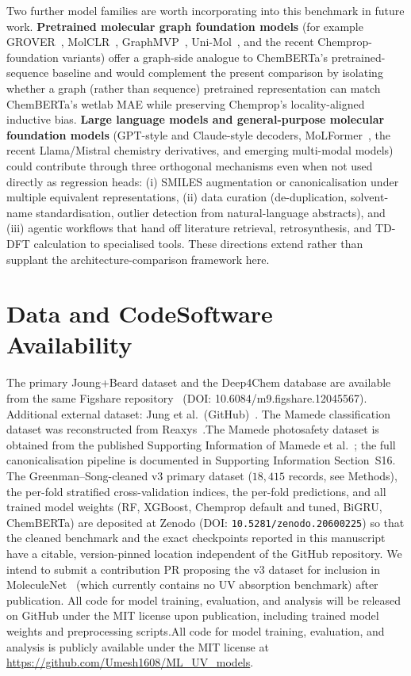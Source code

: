 \documentclass[journal=jcisd8,manuscript=article]{achemso}
\newcommand{\added}[1]{{\color{addedblue}#1}}
\newcommand{\removed}[1]{{\color{removedred}#1}}
\begin{document}
\added{Two further model families are worth incorporating into this benchmark in future work. \textbf{Pretrained molecular graph foundation models} (for example GROVER~\cite{rong2020grover}, MolCLR~\cite{wang2022molecular}, GraphMVP~\cite{liu2021pretraining}, Uni-Mol~\cite{zhou2023unimol}, and the recent Chemprop-foundation variants) offer a graph-side analogue to ChemBERTa's pretrained-sequence baseline and would complement the present comparison by isolating whether a graph (rather than sequence) pretrained representation can match ChemBERTa's wetlab MAE while preserving Chemprop's locality-aligned inductive bias. \textbf{Large language models and general-purpose molecular foundation models} (GPT-style and Claude-style decoders, MoLFormer~\cite{ross2022molformer}, the recent Llama/Mistral chemistry derivatives, and emerging multi-modal models) could contribute through three orthogonal mechanisms even when not used directly as regression heads: (i) SMILES augmentation or canonicalisation under multiple equivalent representations, (ii) data curation (de-duplication, solvent-name standardisation, outlier detection from natural-language abstracts), and (iii) agentic workflows that hand off literature retrieval, retrosynthesis, and TD-DFT calculation to specialised tools. These directions extend rather than supplant the architecture-comparison framework here.}


\section*{Data and \removed{Code}\added{Software} Availability}
The primary Joung+Beard dataset and the Deep4Chem database are available from the same Figshare repository~\cite{joung2020experimental, beard2019comparative} (DOI: 10.6084/m9.figshare.12045567).
Additional external dataset: Jung et al.\ (GitHub)~\cite{jung2024machine}.
\removed{The Mamede classification dataset was reconstructed from Reaxys~\cite{mamede2021machine}.}\added{The Mamede photosafety dataset is obtained from the published Supporting Information of Mamede et al.~\cite{mamede2021machine}; the full canonicalisation pipeline is documented in Supporting Information Section~S16.}
\added{The Greenman--Song-cleaned v3 primary dataset ($18{,}415$ records, see Methods), the per-fold stratified cross-validation indices, the per-fold predictions, and all trained model weights (RF, XGBoost, Chemprop default and tuned, BiGRU, ChemBERTa) are deposited at Zenodo (DOI: \texttt{10.5281/zenodo.20600225}) so that the cleaned benchmark and the exact checkpoints reported in this manuscript have a citable, version-pinned location independent of the GitHub repository. We intend to submit a contribution PR proposing the v3 dataset for inclusion in MoleculeNet~\cite{wuMoleculeNet2018} (which currently contains no UV absorption benchmark) after publication.}
\removed{All code for model training, evaluation, and analysis will be released on GitHub under the MIT license upon publication, including trained model weights and preprocessing scripts.}\added{All code for model training, evaluation, and analysis is publicly available under the MIT license at \url{https://github.com/Umesh1608/ML_UV_models}.}
\end{document}

